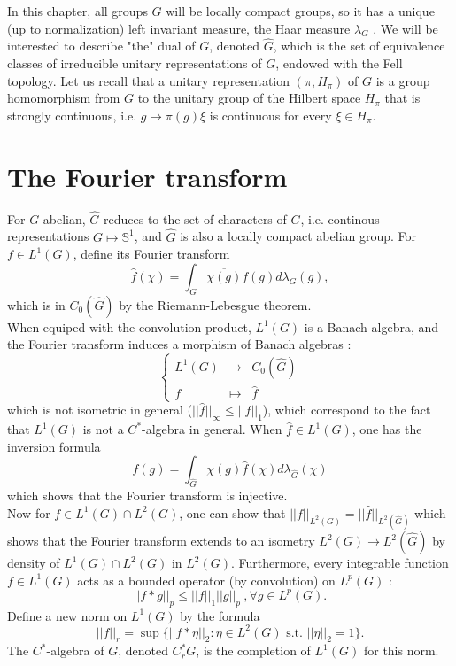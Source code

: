In this chapter, all groups $G$ will be locally compact groups, so it has a unique (up to normalization) left invariant measure, the Haar measure $\lambda_G$ . We will be interested to describe "the" dual of $G$, denoted $\hat G$, which is the set of equivalence classes of irreducible unitary representations of $G$, endowed with the Fell topology. Let us recall that a unitary representation $(\pi,H_\pi)$ of $G$ is a group homomorphism from $G$ to the unitary group of the Hilbert space $H_\pi$ that is strongly continuous, i.e. $g\mapsto \pi(g)\xi$ is continuous for every $\xi\in H_\pi$.
 
\section{The Fourier transform}

For $G$ abelian, $\hat G$ reduces to the set of characters of $G$, i.e. continous representations $G\mapsto \mathbb S^1$, and $\hat G$ is also a locally compact abelian group. For $f\in L^1(G)$, define its Fourier transform
\[\hat f(\chi)=\int_{G} \overline{\chi(g)}f(g)d\lambda_G(g),\]
which is in $C_0(\hat G)$ by the Riemann-Lebesgue theorem.\\

When equiped with the convolution product, $L^1(G)$ is a Banach algebra, and the Fourier transform induces a morphism of Banach algebras :
\[\left\{\begin{array}{rcl}
L^1(G) & \rightarrow & C_0(\hat G) \\
f & \mapsto & \hat f\end{array}\right.\]
which is not isometric in general ($||\hat f||_\infty\leq ||f||_1$), which correspond to the fact that $L^1(G)$ is not a $C^*$-algebra in general. When $\hat f\in L^1(G)$, one has the inversion formula
\[f(g)=\int_{\hat G} \chi(g) \hat f(\chi)d\lambda_{\hat G}(\chi)\]
which shows that the Fourier transform is injective.\\

Now for $f\in L^1(G)\cap L^2(G)$, one can show that $|| f ||_{L^2(G)}=|| \hat f ||_{L^2(\hat G)}$ which shows that the Fourier transform extends to an isometry $L^2(G)\rightarrow L^2(\hat G)$ by density of $L^1(G)\cap L^2(G)$ in $L^2(G)$. Furthermore, every integrable function $f\in L^1(G)$ acts as a bounded operator (by convolution) on $L^p(G)$ :
\[||f \ast g||_p \leq ||f||_1 ||g||_p\ ,\forall g\in L^p(G).\]
Define a new norm on $L^1(G)$ by the formula 
\[ ||f||_r = \sup \{ ||f\ast \eta||_2 : \eta\in L^2(G) \text{ s.t. } ||\eta||_2=1\}.\]
The $C^*$-algebra of $G$, denoted $C_r^*G$, is the completion of $L^1(G)$ for this norm. 


